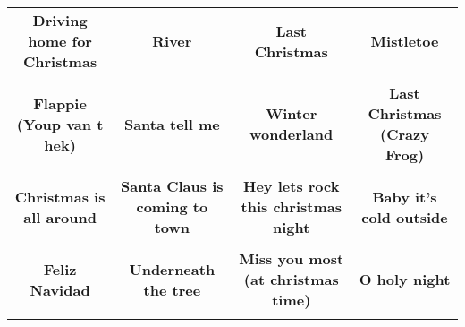 \documentclass[12pt]{article} \usepackage{eso-pic, graphicx}
\newcommand{\background}[1]{%
\AddToShipoutPictureBG*{\texttt{[image: \#1]}}
}
\begin{document}
\tabcolsep=30.2pt \renewcommand{\arraystretch}{4.5}   \vspace*{4.3cm} \begin{center}  \begin{tabular}{c c c c}
\parbox{3cm}{\centering \textbf{Driving home for Christmas}}& 
\parbox{3cm}{\centering \textbf{River}}& 
\parbox{3cm}{\centering \textbf{Last Christmas}}& 
\parbox{3cm}{\centering \textbf{Mistletoe}}\\ \\ 
\parbox{3cm}{\centering \textbf{Flappie (Youp van t hek)}}& 
\parbox{3cm}{\centering \textbf{Santa tell me}}& 
\parbox{3cm}{\centering \textbf{Winter wonderland}}& 
\parbox{3cm}{\centering \textbf{Last Christmas (Crazy Frog)}}\\ \\ 
\parbox{3cm}{\centering \textbf{Christmas is all around}}& 
\parbox{3cm}{\centering \textbf{Santa Claus is coming to town}}& 
\parbox{3cm}{\centering \textbf{Hey lets rock this christmas night}}& 
\parbox{3cm}{\centering \textbf{Baby it’s cold outside}}\\ \\ 
\parbox{3cm}{\centering \textbf{Feliz Navidad}}& 
\parbox{3cm}{\centering \textbf{Underneath the tree}}& 
\parbox{3cm}{\centering \textbf{Miss you most (at christmas time)}}& 
\parbox{3cm}{\centering \textbf{O holy night}}\\ \\ 
\end{tabular} \background{discobingo.pdf} \end{center} 
\end{document}
